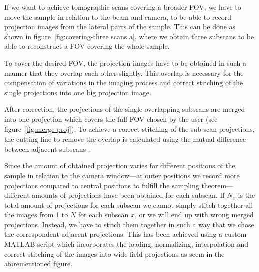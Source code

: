 If we want to achieve tomographic scans covering a broader FOV, we have to move the sample in relation to the beam and camera, to be able to record projection images from the lateral parts of the sample. This can be done as shown in figure~\ref{fig:covering-three scans a},  where we obtain three subscans to be able to reconstruct a FOV covering the whole sample.

\begin{figure*}[tb]
	\centering
	
	\caption{Covering the FOV -- three scans $\rightarrow$ sample has to move, explain that we still only do \SI{180}{\degree} scans!}
	\label{fig:covering-three scans a}
\end{figure*}

\begin{figure*}[tb]
	\centering
	
	\caption{Or is this better for the understanding?: Covering the FOV -- three scans $\rightarrow$ sample has to move, explain that we still only do \SI{180}{\degree} scans!}
	\label{fig:covering-three scans b}
\end{figure*}

To cover the desired FOV, the projection images have to be obtained in such a manner that they overlap each other slightly. This overlap is necessary for the compensation of variations in the imaging process and correct stitching of the single projections into one big projection image. 

After correction, the projections of the single overlapping subscans are merged into one projection which covers the full FOV chosen by the user (see figure~\ref{fig:merge-proj}). To achieve a correct stitching of the sub-scan projections, the cutting line to remove the overlap is calculated using the mutual difference between adjacent subscans .

Since the amount of obtained projection varies for different positions of the sample in relation to the camera window---at outer positions we record more projections compared to central positions to fulfill the sampling theorem---different amounts of projections have been obtained for each subscan. If $N_x$ is the total amount of projections for each subscan we cannot simply stitch together all the images from 1 to $N$ for each subscan $x$, or we will end up with wrong merged projections. Instead, we have to stitch them together in such a way that we chose the correspondent adjacent projections.   This has been achieved using a custom MATLAB\textsuperscript{\textregistered} script which incorporates the loading, normalizing, interpolation and correct stitching of the images into wide field projections as seem in the aforementioned figure.


